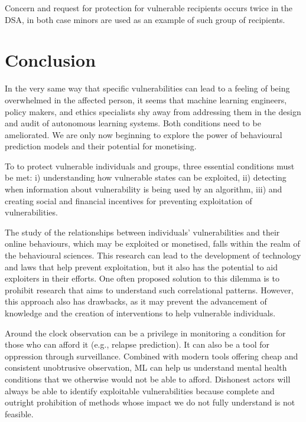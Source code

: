 \documentclass[11pt,theapa]{article}
\theoremstyle{plain}
\begin{document}
Concern and request for protection for vulnerable recipients occurs twice in the DSA, in both case minors are used as an example of such group of recipients. 
\section{Conclusion}
In the very same way that specific vulnerabilities can lead to a feeling of being overwhelmed in the affected person, it seems that machine learning engineers, policy makers, and ethics specialists shy away from addressing them in the design and audit of autonomous learning systems. Both conditions need to be ameliorated. We are only now beginning to explore the power of behavioural prediction models and their potential for monetising. 

To to protect vulnerable individuals and groups, three essential conditions must be met: i) understanding how vulnerable states can be exploited, ii) detecting when information about vulnerability is being used by an algorithm, iii) and creating social and financial incentives for preventing exploitation of vulnerabilities. 


The study of the relationships between individuals' vulnerabilities and their online behaviours, which may be exploited or monetised, falls within the realm of the behavioural sciences. This research can lead to the development of technology and laws that help prevent exploitation, but it also has the potential to aid exploiters in their efforts. One often proposed solution to this dilemma is to prohibit research that aims to understand such correlational patterns. However, this approach also has drawbacks, as it may prevent the advancement of knowledge and the creation of interventions to help vulnerable individuals.

Around the clock observation can be a privilege in monitoring a condition for those who can afford it (e.g., relapse prediction). It can also be a tool for oppression through surveillance. Combined with modern tools offering cheap and consistent unobtrusive observation, ML can help us understand mental health conditions that we otherwise would not be able to afford. Dishonest actors will always be able to identify exploitable vulnerabilities because complete and outright prohibition of methods whose impact we do not fully understand is not feasible. 
\end{document}
